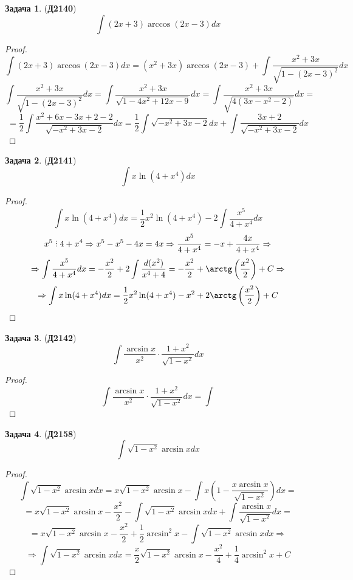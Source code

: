 \documentclass[12pt]{article}
\theoremstyle{definition}
\newtheorem{problem}{Задача}
\DeclareRobustCommand{\divby}{%
	\mathrel{\text{\vbox{\baselineskip.65ex\lineskiplimit0pt\hbox{.}\hbox{.}\hbox{.}}}}%
}
\DeclareMathOperator{\dint}{\displaystyle\int}
\begin{document}
\begin{problem}(\textbf{Д2140})
	$$
		\dint (2x + 3)\arccos(2x -3)dx
	$$
\end{problem}
\begin{proof}
	$$
		\dint (2x + 3)\arccos(2x -3)dx = (x^2 + 3x)\arccos(2x - 3) + \dint \dfrac{x^2 + 3x}{\sqrt{1 - (2x - 3)^2}}dx
	$$
	$$
		\dint \dfrac{x^2 + 3x}{\sqrt{1 - (2x - 3)^2}}dx = \dint\dfrac{x^2 + 3x}{\sqrt{1-4x^2 +12x -9}}dx = \dint \dfrac{x^2 + 3x}{\sqrt{4(3x - x^2 -2)}}dx =
	$$
	$$
		=	\dfrac{1}{2}\dint\dfrac{x^2 + 6x - 3x + 2 - 2}{\sqrt{-x^2 + 3x -2}}dx = \dfrac{1}{2}\dint\sqrt{-x^2 + 3x -2}dx + \dint\dfrac{3x + 2}{\sqrt{-x^2 + 3x -2}}dx
	$$
\end{proof}

\begin{problem}(\textbf{Д2141})
	$$
		\dint x\ln(4 + x^4)dx
	$$
\end{problem}
\begin{proof}
	$$
		\dint x\ln(4 + x^4)dx = \dfrac{1}{2}x^2\ln( 4 + x^4) - 2\dint \dfrac{x^5}{4 + x^4}dx
	$$
	$$
		x^5 \divby 4 + x^4 \Rightarrow x^5 - x^5 - 4x = 4x \Rightarrow \dfrac{x^5}{4 +x^4} = -x + \dfrac{4x}{4 + x^4} \Rightarrow
	$$
	$$
		\Rightarrow \dint \dfrac{x^5}{4 + x^4}dx = -\dfrac{x^2}{2} + 2\dint \dfrac{d(x^2)}{x^4 + 4} = -\dfrac{x^2}{2} + \arctg\left(\dfrac{x^2}{2}\right) + C \Rightarrow
	$$
	$$
		\Rightarrow \dint x\ln(4 + x^4)dx = \dfrac{1}{2}x^2\ln( 4 + x^4) -x^2 + 2\arctg\left(\dfrac{x^2}{2}\right) + C 
	$$
\end{proof}

\begin{problem}(\textbf{Д2142})
	$$
		\dint \dfrac{\arcsin{x}}{x^2}{\cdot}\dfrac{1 + x^2}{\sqrt{1 -x^2}}dx
	$$
\end{problem}
\begin{proof}
	$$
		\dint \dfrac{\arcsin{x}}{x^2}{\cdot}\dfrac{1 + x^2}{\sqrt{1 -x^2}}dx =\dint 
	$$
\end{proof}

\begin{problem}(\textbf{Д2158})
	$$
		\dint \sqrt{1-x^2}\arcsin{x}dx
	$$
\end{problem}
\begin{proof}
	$$
		\dint \sqrt{1-x^2}\arcsin{x}dx = x\sqrt{1-x^2}\arcsin{x} - \dint x\left(1 - \dfrac{x\arcsin{x}}{\sqrt{1-x^2}}\right)dx = 
	$$
	$$
		= x\sqrt{1-x^2}\arcsin{x} - \dfrac{x^2}{2} - \dint \sqrt{1-x^2}\arcsin{x}dx + \dint \dfrac{\arcsin{x}}{\sqrt{1-x^2}}dx = 
	$$
	$$
		= x\sqrt{1-x^2}\arcsin{x} - \dfrac{x^2}{2} +\dfrac{1}{2}\arcsin^2{x} - \dint \sqrt{1-x^2}\arcsin{x}dx \Rightarrow
	$$
	$$
		\Rightarrow \dint \sqrt{1-x^2}\arcsin{x}dx = \dfrac{x}{2}\sqrt{1-x^2}\arcsin{x} - \dfrac{x^2}{4} +\dfrac{1}{4}\arcsin^2{x} + C
	$$
\end{proof}
\end{document}
